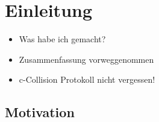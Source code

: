 %
%
%
%
%
%
%
%
%

\chapter{Einleitung}
%

\begin{itemize}
 \item Was habe ich gemacht?
 \item Zusammenfassung vorweggenommen
 \item c-Collision Protokoll nicht vergessen!
\end{itemize}

\section{Motivation}
\label{sec:intro:motivation}
%

